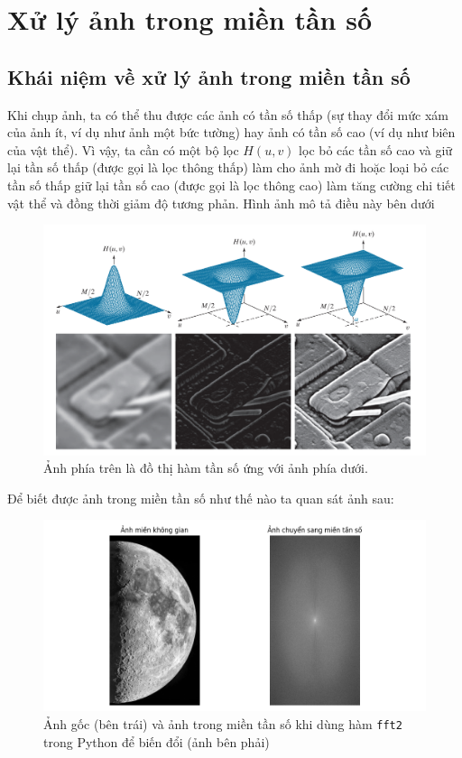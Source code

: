 \documentclass[12pt,a4paper]{report}
\numberwithin{equation}{section}
\theoremstyle{definition} %
\begin{document}
\section{Xử lý ảnh trong miền tần số}
\subsection{Khái niệm về xử lý ảnh trong miền tần số}
Khi chụp ảnh, ta có thể thu được các ảnh có tần số thấp (sự thay đổi mức xám của ảnh ít, ví dụ như ảnh một bức tường) hay ảnh có tần số cao (ví dụ như biên của vật thể). Vì vậy, ta cần có một bộ lọc $H(u,v)$ lọc bỏ các tần số cao và giữ lại tần số thấp (được gọi là lọc thông thấp) làm cho ảnh mờ đi hoặc loại bỏ các tần số thấp giữ lại tần số cao (được gọi là lọc thông cao) làm tăng cường chi tiết vật thể và đồng thời giảm độ tương phản. Hình ảnh mô tả điều này bên dưới

\begin{figure}[H]
	\centering
	\includegraphics[width=15cm]{img/highpassLowpassDemo.png}
	\caption{Ảnh phía trên là đồ thị hàm tần số ứng với ảnh phía dưới.}
	\label{fig19}
\end{figure}
Để biết được ảnh trong miền tần số như thế nào ta quan sát ảnh sau: 
\begin{figure}[H]
	\centering
	\includegraphics[width=15cm]{img/moonFrequencydomain.png}
	\captionsetup{justification=centering}
	\caption{Ảnh gốc (bên trái) và ảnh trong miền tần số khi dùng hàm \texttt{fft2} trong Python để biến đổi (ảnh bên phải) }
	\label{fig110}
\end{figure}
\end{document}
